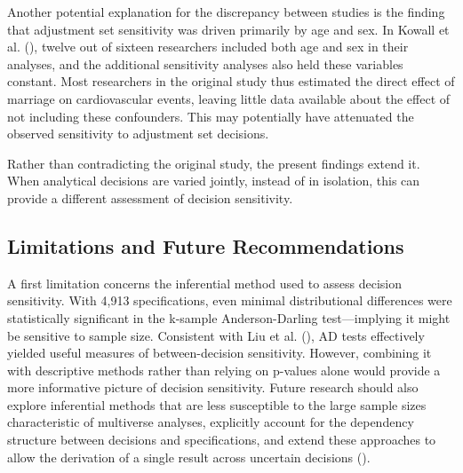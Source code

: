 \documentclass[
  man,
  floatsintext,
  longtable,
  nolmodern,
  notxfonts,
  notimes,
  colorlinks=true,linkcolor=blue,citecolor=blue,urlcolor=blue]{apa7}
\begin{document}
Another potential explanation for the discrepancy between studies is the
finding that adjustment set sensitivity was driven primarily by age and
sex. In Kowall et al. (), twelve
out of sixteen researchers included both age and sex in their analyses,
and the additional sensitivity analyses also held these variables
constant. Most researchers in the original study thus estimated the
direct effect of marriage on cardiovascular events, leaving little data
available about the effect of not including these confounders. This may
potentially have attenuated the observed sensitivity to adjustment set
decisions.

Rather than contradicting the original study, the present findings
extend it. When analytical decisions are varied jointly, instead of in
isolation, this can provide a different assessment of decision
sensitivity.

\subsection{Limitations and Future
Recommendations}\label{limitations-and-future-recommendations}

A first limitation concerns the inferential method used to assess
decision sensitivity. With 4,913 specifications, even minimal
distributional differences were statistically significant in the
k-sample Anderson-Darling test---implying it might be sensitive to
sample size. Consistent with Liu et al.
(), AD tests effectively
yielded useful measures of between-decision sensitivity. However,
combining it with descriptive methods rather than relying on p-values
alone would provide a more informative picture of decision sensitivity.
Future research should also explore inferential methods that are less
susceptible to the large sample sizes characteristic of multiverse
analyses, explicitly account for the dependency structure between
decisions and specifications, and extend these approaches to allow the
derivation of a single result across uncertain decisions
().
\end{document}
